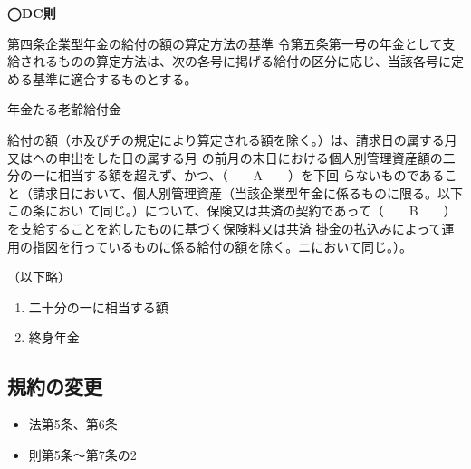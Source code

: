 \begin{fillblank}[年金1 2025 問題1(2)ウエ]
    \noindent \textbf{◯DC則}
  \begin{lawstructure}
    \begin{lawarticle}{第四条}{企業型年金の給付の額の算定方法の基準}
      令第五条第一号の年金として支給されるものの算定方法は、次の各号に掲げる給付の区分に応じ、当該各号に定める基準に適合するものとする。

      年金たる老齢給付金


      給付の額（ホ及びチの規定により算定される額を除く。）は、請求日の属する月又はヘの申出をした日の属する月
      の前月の末日における個人別管理資産額の二分の一に相当する額を超えず、かつ、（　　A　　）を下回
      らないものであること（請求日において、個人別管理資産（当該企業型年金に係るものに限る。以下この条におい
      て同じ。）について、保険又は共済の契約であって（　　B　　）を支給することを約したものに基づく保険料又は共済
      掛金の払込みによって運用の指図を行っているものに係る給付の額を除く。ニにおいて同じ。）。

      （以下略）

    \end{lawarticle}
  \end{lawstructure}
\end{fillblank}

\begin{answerbox}
  \begin{enumerate}[A:]
    \item 二十分の一に相当する額
    \item 終身年金
  \end{enumerate}
\end{answerbox}




\newpage

\subsection{規約の変更}

\begin{InyouJobunbox}
  \begin{itemize}
    \item 法第5条、第6条
    \item 則第5条〜第7条の2
  \end{itemize}
\end{InyouJobunbox}

